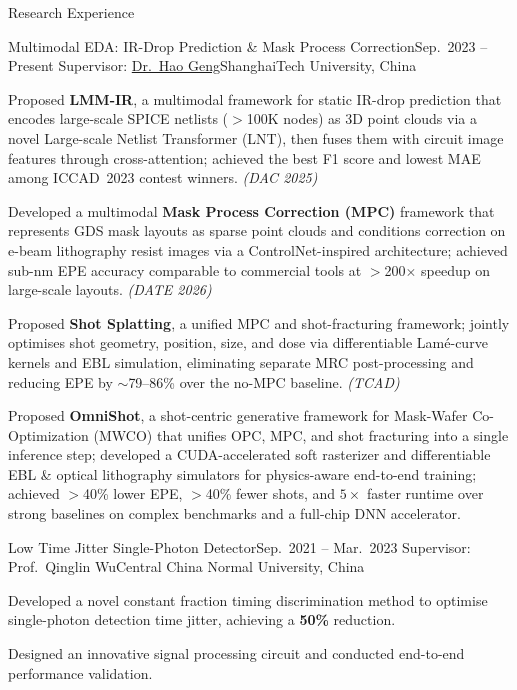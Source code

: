 \documentclass{resume}
\begin{document}
\begin{rSection}{Research Experience}

\begin{rSubsection}%
  {Multimodal EDA: IR-Drop Prediction \& Mask Process Correction}{Sep.\ 2023 -- Present}%
  {Supervisor: \href{https://true-genghao.github.io/genghao/}{Dr.\ Hao Geng}}{ShanghaiTech University, China}
  \item Proposed \textbf{LMM-IR}, a multimodal framework for static IR-drop prediction that encodes
        large-scale SPICE netlists ($>$100K nodes) as 3D point clouds via a novel Large-scale Netlist
        Transformer (LNT), then fuses them with circuit image features through cross-attention;
        achieved the best F1 score and lowest MAE among ICCAD~2023 contest winners. \textit{(DAC 2025)}
  \item Developed a multimodal \textbf{Mask Process Correction (MPC)} framework that represents GDS
        mask layouts as sparse point clouds and conditions correction on e-beam lithography resist
        images via a ControlNet-inspired architecture; achieved sub-nm EPE accuracy comparable
        to commercial tools at $>$200$\times$ speedup on large-scale layouts. \textit{(DATE 2026)}
  \item Proposed \textbf{Shot Splatting}, a unified MPC and shot-fracturing framework; jointly optimises shot geometry, position, size, and dose via
        differentiable Lam\'{e}-curve kernels and EBL simulation, eliminating separate MRC
        post-processing and reducing EPE by $\sim$79--86\% over the no-MPC baseline. \textit{(TCAD)}

  \item Proposed \textbf{OmniShot}, a shot-centric generative framework for Mask-Wafer
        Co-Optimization (MWCO) that unifies OPC, MPC, and shot fracturing into a single
        inference step; developed a CUDA-accelerated soft rasterizer and differentiable EBL
        \& optical lithography simulators for physics-aware end-to-end training; achieved
        $>$40\% lower EPE, $>$40\% fewer shots, and $5\times$ faster runtime over strong
        baselines on complex benchmarks and a full-chip DNN accelerator.
\end{rSubsection}


\begin{rSubsection}%
  {Low Time Jitter Single-Photon Detector}{Sep.\ 2021 -- Mar.\ 2023}%
  {Supervisor: Prof.\ Qinglin Wu}{Central China Normal University, China}
  \item Developed a novel constant fraction timing discrimination method to optimise
        single-photon detection time jitter, achieving a \textbf{50\%} reduction.
  \item Designed an innovative signal processing circuit and conducted end-to-end
        performance validation.
\end{rSubsection}


\end{rSection}
\end{document}
